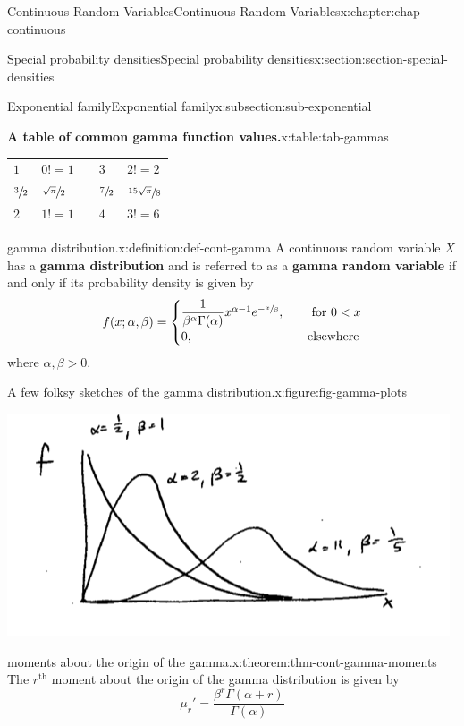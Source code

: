 \documentclass[oneside,10pt,]{book}
\newcommand{\terminology}[1]{\textbf{#1}}
\numberwithin{equation}{section}
\newcommand{\lt}{<}
\newcommand{\gt}{>}
\newcommand{\amp}{&}
\begin{document}
\begin{chapterptx}{Continuous Random Variables}{}{Continuous Random Variables}{}{}{x:chapter:chap-continuous}
\begin{sectionptx}{Special probability densities}{}{Special probability densities}{}{}{x:section:section-special-densities}
\begin{subsectionptx}{Exponential family}{}{Exponential family}{}{}{x:subsection:sub-exponential}
\begin{tableptx}{\textbf{A table of common gamma function values.}}{x:table:tab-gammas}{}
{\begin{tabular}{lllll}
\(1\)&\(0! = 1\)&&\(3\)&\(2! = 2\)\tabularnewline[0pt]
\(\sfrac{3}{2}\)&\(\sfrac{\sqrt{\pi}}{2}\)&&\(\sfrac{7}{2}\)&\(\sfrac{15\sqrt{\pi}}{8}\)\tabularnewline[0pt]
\(2\)&\(1! = 1\)&&\(4\)&\(3! = 6\)
\end{tabular}
}%
\end{tableptx}%
\begin{definition}{gamma distribution.}{x:definition:def-cont-gamma}%
A continuous random variable \(\displaystyle X\) has a \terminology{gamma distribution} and is referred to as a \terminology{gamma random variable} if and only if its probability density is given by%
\begin{equation*}
f(x; \alpha, \beta) =
\begin{cases}\dfrac{1}{\beta^\alpha
\Gamma(\alpha)}x^{\alpha-1}e^{-\sfrac{x}{\beta}}, \amp \quad \text{
for }0 \lt x\\0, \amp \quad \text{elsewhere}\end{cases}
\end{equation*}
where \(\alpha, \beta \gt 0\).%
\end{definition}
\begin{figureptx}{A few folksy sketches of the gamma distribution.}{x:figure:fig-gamma-plots}{}%
\begin{image}{0.25}{0.5}{0.25}%
\includegraphics[width=\linewidth]{./images/gammas.png}
\end{image}%
\tcblower
\end{figureptx}%
\begin{theorem}{moments about the origin of the gamma.}{}{x:theorem:thm-cont-gamma-moments}%
The \(r^{\text{th}}\) moment about the origin of the gamma distribution is given by%
\begin{equation*}
\mu_r' = \dfrac{\beta^r\Gamma(\alpha+r)}{\Gamma(\alpha)}
\end{equation*}
%
\end{theorem}

\end{subsectionptx}
\end{sectionptx}
\end{chapterptx}
\end{document}

